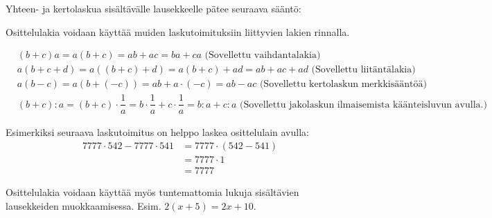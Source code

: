 Yhteen- ja kertolaskua sisältävälle lausekkeelle pätee seuraava sääntö:


Osittelulakia voidaan käyttää muiden laskutoimituksiin liittyvien lakien rinnalla.

\begin{esimerkki}
\begin{align*}
&(b+c)a = a(b+c) = ab+ac = ba+ca \text{ (Sovellettu vaihdantalakia)} \\
&a(b+c+d) = a((b+c)+d) = a(b+c)+ad = ab+ac+ad \text{ (Sovellettu liitäntälakia)} \\
&a(b-c) = a(b+(-c))=ab+a\cdot(-c)=ab-ac \text{ (Sovellettu kertolaskun merkkisääntöä)} \\
&(b+c):a = (b+c)\cdot\dfrac1a = b\cdot\dfrac1a+c\cdot\dfrac1a = b:a+c:a \text{ (Sovellettu jakolaskun ilmaisemista käänteisluvun avulla.) }
\end{align*}

Esimerkiksi seuraava laskutoimitus on helppo laskea osittelulain avulla: 
     \begin{align*}
	  7777\cdot 542-7777\cdot 541 &= 7777\cdot (542-541)  \\ &= 7777\cdot 1 \\ &= 7777
     \end{align*}
\end{esimerkki}

Osittelulakia voidaan käyttää myös tuntemattomia lukuja sisältävien lausekkeiden muokkaamisessa. Esim. $2(x+5)=2x+10$.

